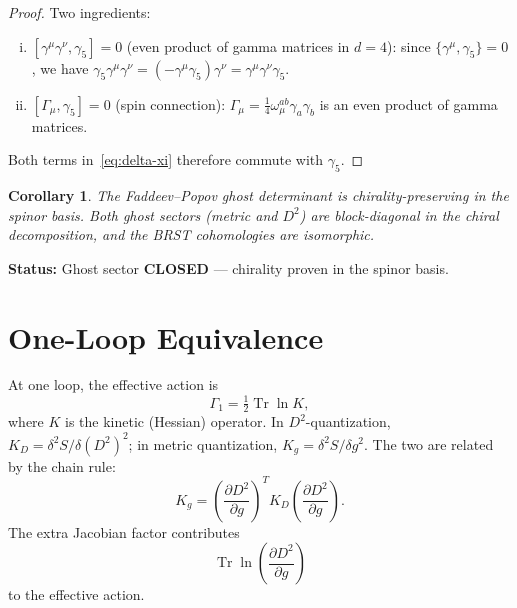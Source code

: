 \documentclass[12pt,a4paper]{article}
\newcommand{\Tr}{\operatorname{Tr}}
\newcommand{\half}{\tfrac{1}{2}}
\newtheorem{corollary}[theorem]{Corollary}
\theoremstyle{definition}
\theoremstyle{remark}
\begin{document}
\begin{proof}
Two ingredients:
\begin{enumerate}[(i)]
  \item $[\gamma^\mu\gamma^\nu, \gamma_5] = 0$ (even product of gamma
    matrices in $d = 4$): since $\{\gamma^\mu, \gamma_5\} = 0$, we have
    $\gamma_5 \gamma^\mu\gamma^\nu = (-\gamma^\mu\gamma_5)\gamma^\nu
    = \gamma^\mu\gamma^\nu\gamma_5$.
  \item $[\Gamma_\mu, \gamma_5] = 0$ (spin connection):
    $\Gamma_\mu = \tfrac{1}{4}\omega_\mu^{ab}\gamma_a\gamma_b$
    is an even product of gamma matrices.
\end{enumerate}
Both terms in~\eqref{eq:delta-xi} therefore commute with $\gamma_5$.
\end{proof}

\begin{corollary}
The Faddeev--Popov ghost determinant is chirality-preserving in the
spinor basis.  Both ghost sectors (metric and $D^2$) are block-diagonal
in the chiral decomposition, and the BRST cohomologies are isomorphic.
\end{corollary}

\noindent\textbf{Status:} Ghost sector \textbf{CLOSED} --- chirality
proven in the spinor basis.

\section{One-Loop Equivalence}
\label{sec:one-loop}

At one loop, the effective action is
\begin{equation}
  \Gamma_1 = \half \Tr\ln K,
\end{equation}
where $K$ is the kinetic (Hessian) operator.  In $D^2$-quantization,
$K_D = \delta^2 S / \delta(D^2)^2$; in metric quantization,
$K_g = \delta^2 S / \delta g^2$.  The two are related by the chain rule:
\begin{equation}\label{eq:chain-rule}
  K_g = \left(\frac{\partial D^2}{\partial g}\right)^{\!T}
  K_D \left(\frac{\partial D^2}{\partial g}\right).
\end{equation}
The extra Jacobian factor contributes
\begin{equation}
  \Tr\ln\!\left(\frac{\partial D^2}{\partial g}\right)
\end{equation}
to the effective action.
\end{document}
